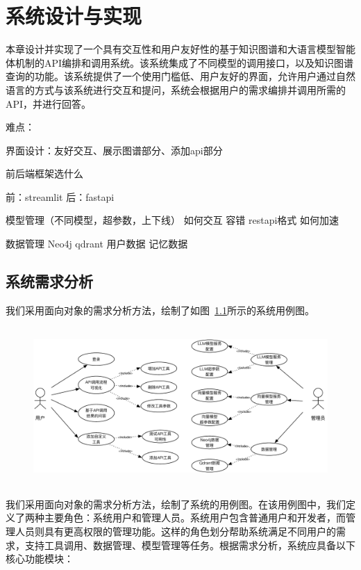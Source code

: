 
\chapter{系统设计与实现}

本章设计并实现了一个具有交互性和用户友好性的基于知识图谱和大语言模型智能体机制的API编排和调用系统。该系统集成了不同模型的调用接口，以及知识图谱查询的功能。该系统提供了一个使用门槛低、用户友好的界面，允许用户通过自然语言的方式与该系统进行交互和提问，系统会根据用户的需求编排并调用所需的API，并进行回答。

难点：

界面设计：友好交互、展示图谱部分、添加api部分

前后端框架选什么

前：streamlit 后：fastapi


模型管理（不同模型，超参数，上下线） 如何交互 容错 restapi格式 如何加速

数据管理 Neo4j qdrant 用户数据 记忆数据

\section{系统需求分析}

\indent 我们采用面向对象的需求分析方法，绘制了如图~\ref{fig:usecase}所示的系统用例图。

\begin{figure}[!htp]
  \vspace{1em}
  \centering
  \setlength{\abovecaptionskip}{10pt} %
  \includegraphics[height=6cm]{../assets/ch5-用例图.pdf}
  \label{fig:usecase}
\end{figure}

我们采用面向对象的需求分析方法，绘制了系统的用例图。在该用例图中，我们定义了两种主要角色：系统用户和管理人员。系统用户包含普通用户和开发者，而管理人员则具有更高权限的管理功能。这样的角色划分帮助系统满足不同用户的需求，支持工具调用、数据管理、模型管理等任务。根据需求分析，系统应具备以下核心功能模块：

